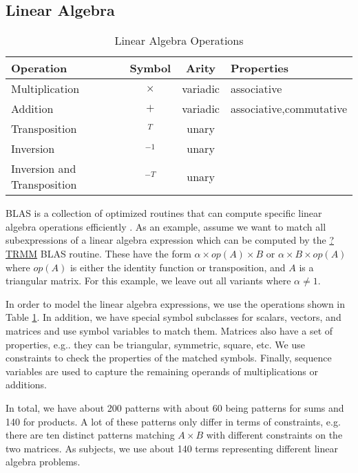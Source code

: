 \documentclass[conference,compsoc]{IEEEtran}
\makeatletter
\DeclareRobustCommand\onedot{\futurelet\@let@token\@onedot}
\def\@onedot{\ifx\@let@token.\else.\null\fi\xspace}
\def\eg{{e.g}\onedot} \def\Eg{{E.g}\onedot}
\makeatother
\begin{document}
\subsection{Linear Algebra}



\begin{table}
    \centering
    \caption{Linear Algebra Operations}
    \renewcommand{\arraystretch}{1.2}
    \begin{tabular}{l c c p{1.5cm}}
        \toprule
        \textbf{Operation} & \textbf{Symbol} & \textbf{Arity} & \textbf{Properties} \\
        \midrule
        Multiplication & $\times$ & variadic & associative \\
        Addition & $+$ & variadic & associative,\newline commutative \\
        Transposition & ${}^T$ & unary & \\
        Inversion & ${}^{-1}$ & unary & \\
        Inversion and Transposition & ${}^{-T}$ & unary & \\
        \bottomrule
    \end{tabular}
\label{tbl:laop}
\end{table}

BLAS is a collection of optimized routines that can compute specific linear algebra operations efficiently \cite{Lawson1979,Dongarra1988,Dongarra1990}.
As an example, assume we want to match all subexpressions of a linear algebra expression which can be computed by the \href{https://software.intel.com/en-us/node/468494}{?TRMM} BLAS routine.
These have the form $\alpha \times op(A)  \times B$ or $\alpha  \times B  \times op(A)$ where
$op(A)$ is either the identity function or transposition, and $A$ is a triangular matrix.
For this example, we leave out all variants where $\alpha \neq 1$.

In order to model the linear algebra expressions, we use the operations shown in Table \ref{tbl:laop}.
In addition, we have special symbol subclasses for scalars, vectors, and matrices and use symbol variables to match them.
Matrices also have a set of properties, \eg they can be triangular, symmetric, square, etc.
We use constraints to check the properties of the matched symbols.
Finally, sequence variables are used to capture the remaining operands of multiplications or additions.

In total, we have about 200 patterns with about 60 being patterns for sums and 140 for products.
A lot of these patterns only differ in terms of constraints, e.g. there are ten distinct patterns matching $A \times B$ with different constraints on the two matrices.
As subjects, we use about 140 terms representing different linear algebra problems.
\end{document}

